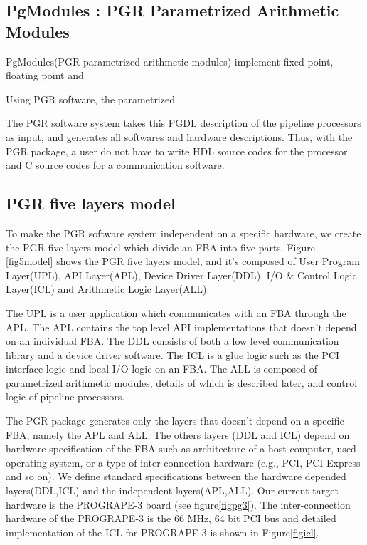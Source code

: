 \documentclass{llncs}
\begin{document}
\subsection{PgModules : PGR Parametrized Arithmetic Modules}

PgModules(PGR parametrized arithmetic modules) implement fixed point, 
floating point and 

Using PGR software, the parametrized 

The PGR software system takes this PGDL description of the pipeline processors
as input, and generates all softwares and hardware descriptions.
Thus, with the PGR package, a user do not have to write HDL source codes for
the processor and C source codes for a communication software.

\subsection{PGR five layers model}
To make the PGR software system independent on a specific hardware,
we create the PGR five layers model which divide 
an FBA into five parts.
Figure \ref{fig5model} shows the PGR five layers model, 
and it's composed of User Program Layer(UPL), API Layer(APL),
Device Driver Layer(DDL), I/O \& Control Logic Layer(ICL) and
Arithmetic Logic Layer(ALL).

The UPL is a user application which communicates
with an FBA through the APL.
The APL contains the top level API implementations that
doesn't depend on an individual FBA.
The DDL consists of both a low level communication library and a device driver software. 
The ICL is a glue logic such as the PCI interface logic and 
local I/O logic on an FBA.
The ALL is composed of parametrized arithmetic modules,
details of which is described later, 
and control logic of pipeline processors.

The PGR package generates only the layers that doesn't depend on 
a specific FBA, namely the APL and ALL.
The others layers (DDL and ICL) depend on hardware specification
of the FBA such as architecture of a host computer, used operating
system, or a type of inter-connection hardware (e.g., PCI, PCI-Express and so on).
We define standard specifications between the hardware depended layers(DDL,ICL)
and the independent layers(APL,ALL).
Our current target hardware is the PROGRAPE-3 board (see figure\ref{figpg3}).
The inter-connection hardware of the PROGRAPE-3 is the 66 MHz, 64 bit PCI bus
and detailed implementation of the ICL for PROGRAPE-3
is shown in Figure\ref{figicl}.
\end{document}
